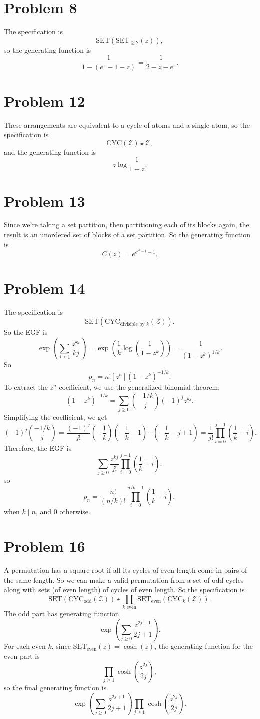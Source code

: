 \documentclass{article}
\newcommand{\mcZ}{\mathcal{Z}}
\newcommand{\set}{\mathrm{SET}}
\newcommand{\cyc}{\mathrm{CYC}}
\newcommand{\bigp}[1]{\left(#1\right)}
\begin{document}
\section*{Problem 8}
The specification is
$$\set(\set_{\ge 2}(z)),$$
so the generating function is
$$\frac{1}{1 - (e^z - 1 - z)} = \frac{1}{2 - z - e^z}.$$

\section*{Problem 12}
These arrangements are equivalent to a cycle of atoms and a single atom, so the specification is
$$\cyc(\mcZ) \star \mcZ,$$
and the generating function is
$$z \log \frac{1}{1 - z}.$$

\section*{Problem 13}
Since we're taking a set partition, then partitioning each of its blocks again, the result is an unordered set of blocks of a set partition. So the generating function is
$$C(z) = e^{e^{e^z - 1} - 1}.$$

\section*{Problem 14}
The specification is
$$\set(\cyc_{\text{divisible by }k}(\mcZ)).$$
So the EGF is
$$\exp\bigp{\sum_{j \ge 1} \frac{z^{kj}}{kj}} = \exp\bigp{\frac{1}{k}\log\bigp{\frac{1}{1 - z^k}}} = \frac{1}{(1 - z^k)^{1/k}}.$$
So
$$p_n = n![z^n](1 - z^k)^{-1/k}.$$
To extract the $z^n$ coefficient, we use the generalized binomial theorem:
$$(1 - z^k)^{-1/k} = \sum_{j \ge 0}\binom{-1/k}{j}(-1)^jz^{kj}.$$
Simplifying the coefficient, we get
$$(-1)^j \binom{-1/k}{j} = \frac{(-1)^j}{j!}\bigp{-\frac{1}{k}}\bigp{-\frac{1}{k} - 1}\cdots \bigp{-\frac{1}{k} - j + 1} = \frac{1}{j!}\prod_{i = 0}^{j - 1}\bigp{\frac{1}{k} + i}.$$
Therefore, the EGF is
$$\sum_{j \ge 0}\frac{z^{kj}}{j!}\prod_{i = 0}^{j - 1}\bigp{\frac{1}{k} + i},$$
so
$$p_n = \frac{n!}{(n/k)!}\prod_{i = 0}^{n/k - 1} \bigp{\frac{1}{k} + i},$$
when $k \mid n$, and $0$ otherwise.

\section*{Problem 16}
A permutation has a square root if all its cycles of even length come in pairs of the same length. So we can make a valid permutation from a set of odd cycles along with sets (of even length) of cycles of even length. So the specification is
$$\set(\cyc_{\mathrm{odd}}(\mcZ)) \star \prod_{k \text{ even}} \set_{\text{even}}(\cyc_k(\mcZ)).$$
The odd part has generating function
$$\exp\bigp{\sum_{j \ge 0} \frac{z^{2j + 1}}{2j + 1}}.$$
For each even $k$, since $\set_{\text{even}}(z) = \cosh(z)$, the generating function for the even part is
$$\prod_{j \ge 1} \cosh\bigp{\frac{z^{2j}}{2j}},$$
so the final generating function is
$$\exp\bigp{\sum_{j \ge 0} \frac{z^{2j + 1}}{2j + 1}}\prod_{j \ge 1} \cosh\bigp{\frac{z^{2j}}{2j}}.$$
\end{document}
